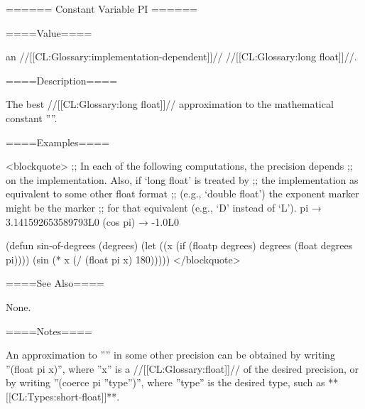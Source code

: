 ====== Constant Variable PI ======

====Value====

an //[[CL:Glossary:implementation-dependent]]// //[[CL:Glossary:long float]]//.

====Description====

The best //[[CL:Glossary:long float]]// approximation to the mathematical constant ''\pi''.

====Examples====

<blockquote> ;; In each of the following computations, the precision depends ;; on the implementation. Also, if `long float' is treated by ;; the implementation as equivalent to some other float format ;; (e.g., `double float') the exponent marker might be the marker ;; for that equivalent (e.g., `D' instead of `L'). pi → 3.141592653589793L0 (cos pi) → -1.0L0

(defun sin-of-degrees (degrees) (let ((x (if (floatp degrees) degrees (float degrees pi)))) (sin (* x (/ (float pi x) 180))))) </blockquote>

====See Also====

None.

====Notes====

An approximation to ''\pi'' in some other precision can be obtained by writing ''(float pi x)'', where ''x'' is a //[[CL:Glossary:float]]// of the desired precision, or by writing ''(coerce pi ''type'')'', where ''type'' is the desired type, such as **[[CL:Types:short-float]]**.

